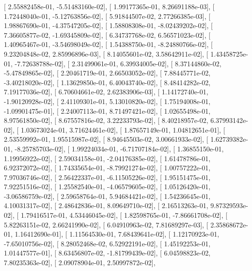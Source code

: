 \documentclass{article}
\begin{document}
       [  2.55882458e-01,  -5.51483160e-02],
       [  1.99177365e-01,   8.26691188e-03],
       [  1.72448040e-01,  -5.12763856e-02],
       [  5.91844507e-02,   2.77266385e-03],
       [  1.98867690e-01,  -4.37547205e-02],
       [  1.58808308e-01,  -8.02439202e-02],
       [  7.36605877e-02,  -1.69345809e-02],
       [  6.34737768e-02,   6.56571023e-02],
       [  1.40965467e-01,  -3.54698049e-02],
       [  1.54388750e-01,  -8.24880766e-02],
       [  9.23204848e-02,   2.85996896e-03],
       [  8.14055601e-02,   3.58642911e-02],
       [  1.43458725e-01,  -7.72638788e-02],
       [  2.31499061e-01,   6.39934005e-02],
       [  8.37144860e-02,  -5.47849865e-02],
       [  2.20461719e-01,   2.66503052e-02],
       [  7.88445771e-02,  -3.40218020e-02],
       [  1.13629850e-01,   6.40043740e-02],
       [  8.48414282e-02,   7.19177036e-02],
       [  6.70604661e-02,   2.62383906e-03],
       [  1.14172740e-01,  -1.90120928e-02],
       [  2.41109301e-01,   5.13010820e-02],
       [  1.75194008e-01,  -1.09901475e-01],
       [  2.24007113e-01,   8.71497421e-02],
       [  1.02655498e-01,   8.97561850e-02],
       [  8.67557816e-02,   3.22233793e-02],
       [  8.40218957e-02,   6.37993142e-02],
       [  1.03673024e-01,   3.71624461e-02],
       [  1.87657149e-01,   1.04812651e-01],
       [  2.53559992e-01,   1.95515987e-02],
       [  8.94645503e-02,   3.00661933e-02],
       [  1.62739382e-01,  -8.25785703e-02],
       [  1.99224034e-01,  -6.71707184e-02],
       [  1.36855150e-01,   1.19956922e-02],
       [  2.59034158e-01,  -2.04176385e-02],
       [  1.61478786e-01,   6.92372072e-02],
       [  1.74335654e-01,  -8.79921274e-02],
       [  1.00757222e-01,   7.97036746e-02],
       [  2.56422337e-01,  -6.11505226e-02],
       [  1.95151475e-01,   7.92251516e-02],
       [  1.25582540e-01,  -4.06579605e-02],
       [  1.05126420e-01,  -3.06586759e-02],
       [  2.59658764e-01,   5.94684421e-02],
       [  1.54236645e-01,   4.10031317e-02],
       [  2.48642836e-01,   8.09649710e-02],
       [  2.16513263e-01,   9.87329593e-02],
       [  1.79416517e-01,   4.53446045e-02],
       [  1.82598765e-01,  -7.86661708e-02],
       [  5.82263151e-02,   2.66241990e-02],
       [  6.04910963e-02,   7.81689297e-03],
       [  2.35868672e-01,   1.16412690e-01],
       [  1.11564530e-01,   7.68439641e-02],
       [  1.12170923e-01,  -7.65010756e-02],
       [  8.28052468e-02,   6.52922191e-02],
       [  1.45192253e-01,   1.01447577e-01],
       [  8.63456807e-02,  -1.81799439e-02],
       [  6.04598823e-02,   7.80235363e-02],
       [  2.09078904e-01,   2.50997872e-02],
\end{document}

